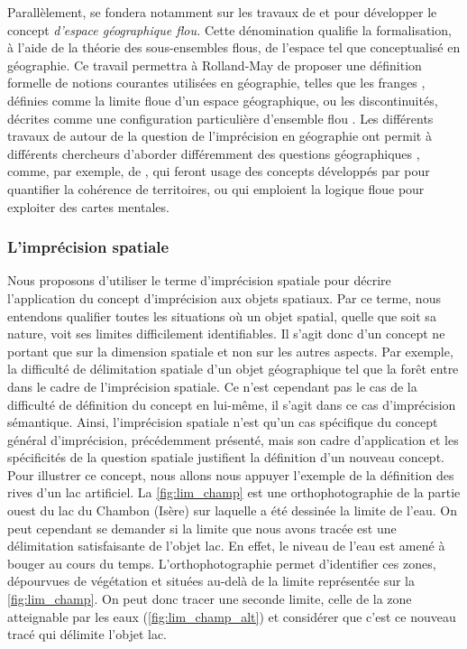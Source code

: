 Parallèlement, \textcite{Rolland-May1984,Rolland-May1987} se fondera
notamment sur les travaux de \textcite{Gale1972,Gale1976} et
\textcite{Leung1979} pour développer le concept\emph{ d’espace
  géographique flou.} Cette dénomination qualifie la formalisation, à
l’aide de la théorie des sous-ensembles flous, de l’espace tel que
conceptualisé en géographie. Ce travail permettra à Rolland-May de
proposer une définition formelle de notions courantes utilisées en
géographie, telles que les franges \autocite{Rolland-May1987},
définies comme la limite floue d’un espace géographique, ou les
discontinuités, décrites comme une configuration particulière
d’ensemble flou \autocite{Rolland-May2003}. Les différents travaux de
 autour de la question de l’imprécision en géographie
ont permit à différents chercheurs d’aborder différemment des
questions géographiques \textcite{Dutozia2014}, comme, par exemple, de
\textcite{Ruffray2009}, qui feront usage des concepts développés par
 pour quantifier la cohérence de territoires, ou
\textcite{Didelon2011} qui emploient la logique floue pour exploiter
des cartes mentales.

\subsubsection{L’imprécision spatiale}

Nous proposons d’utiliser le terme d’imprécision spatiale pour décrire
l’application du concept d’imprécision aux objets spatiaux. Par ce
terme, nous entendons qualifier toutes les situations où un objet
spatial, quelle que soit sa nature, voit ses limites difficilement
identifiables. Il s’agit donc d’un concept ne portant que sur la
dimension spatiale et non sur les autres aspects. Par exemple, la
difficulté de délimitation spatiale d’un objet géographique tel que la
forêt entre dans le cadre de l’imprécision spatiale. Ce n’est
cependant pas le cas de la difficulté de définition du concept en
lui-même, il s’agit dans ce cas d’imprécision sémantique. Ainsi,
l’imprécision spatiale n’est qu’un cas spécifique du concept général
d’imprécision, précédemment présenté, mais son cadre d’application et
les spécificités de la question spatiale justifient la définition d’un
nouveau concept.  Pour illustrer ce concept, nous allons nous appuyer
l’exemple de la définition des rives d’un lac artificiel. La
\autoref{fig:lim_champ} est une orthophotographie de la partie ouest
du lac du Chambon (Isère) sur laquelle a été dessinée la limite de
l’eau. On peut cependant se demander si la limite que nous avons
tracée est une délimitation satisfaisante de l’objet lac. En effet, le
niveau de l’eau est amené à bouger au cours du
temps. L’orthophotographie permet d’identifier ces zones, dépourvues
de végétation et situées au-delà de la limite représentée sur la
\autoref{fig:lim_champ}. On peut donc tracer une seconde limite, celle
de la zone atteignable par les eaux (\autoref{fig:lim_champ_alt}) et
considérer que c’est ce nouveau tracé qui délimite l’objet lac.

